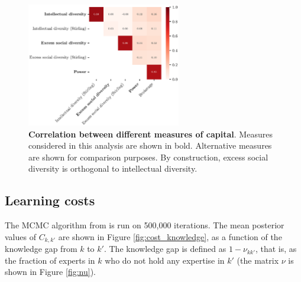 \documentclass{article}
\begin{document}
\begin{figure}[h]
    \centering
    \includegraphics[width=0.6\textwidth]{plots/capital_measures.eps}
    \caption{\textbf{Correlation between different measures of capital}. Measures considered in this analysis are shown in bold. Alternative measures are shown for comparison purposes. By construction, excess social diversity is orthogonal to intellectual diversity. }
    \label{fig:capital_measures}
\end{figure}


\subsection{Learning costs}

The MCMC algorithm from \citet{Chu2021} is run on 500,000 iterations. The mean posterior values of $C_{k,k'}$ are shown in Figure \ref{fig:cost_knowledge}, as a function of the knowledge gap from $k$ to $k'$. The knowledge gap is defined as $1-\nu_{kk'}$, that is, as the fraction of experts in $k$ who do not hold any expertise in $k'$ (the matrix $\nu$ is shown in Figure \ref{fig:nu}).
\end{document}
